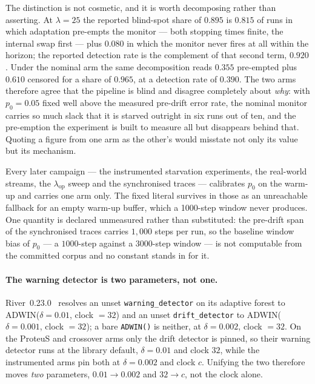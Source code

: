 The distinction is not cosmetic, and it is worth decomposing rather than asserting. At
$\lambda = 25$ the reported blind-spot share of $0.895$ is $0.815$ of runs in which adaptation
pre-empts the monitor --- both stopping times finite, the internal swap first --- plus $0.080$ in
which the monitor never fires at all within the horizon; the reported detection rate is the
complement of that second term, $0.920$. Under the nominal arm the same decomposition reads $0.355$
pre-empted plus $0.610$ censored for a share of $0.965$, at a detection rate of $0.390$. The two
arms therefore agree that the pipeline is blind and disagree completely about \emph{why}: with
$p_0 = 0.05$ fixed well above the measured pre-drift error rate, the nominal monitor carries so much
slack that it is starved outright in six runs out of ten, and the pre-emption the experiment is
built to measure all but disappears behind that. Quoting a figure from one arm as the other's would
misstate not only its value but its mechanism.

Every later campaign --- the instrumented starvation experiments, the real-world streams, the
$\lambda_{\mathrm{op}}$ sweep and the synchronised traces --- calibrates $p_0$ on the warm-up and
carries one arm only. The fixed literal survives in those as an unreachable fallback for an empty
warm-up buffer, which a 1000-step window never produces. One quantity is declared unmeasured
rather than substituted: the pre-drift span of the synchronised traces carries $1{,}000$ steps
per run, so the baseline window bias of $p_0$ --- a $1000$-step against a $3000$-step window ---
is not computable from the committed corpus and no constant stands in for it.

\paragraph{The warning detector is two parameters, not one.}
River~0.23.0~\cite{montiel_river_2021} resolves an unset \texttt{warning\_detector} on its adaptive forest to
ADWIN($\delta = 0.01$, clock $= 32$) and an unset \texttt{drift\_detector} to
ADWIN($\delta = 0.001$, clock $= 32$); a bare \texttt{ADWIN()} is neither, at
$\delta = 0.002$, clock $= 32$. On the ProteuS and crossover arms only the drift detector is pinned, so their warning detector runs at the library default, $\delta = 0.01$ and clock $32$, while the instrumented arms pin both at $\delta = 0.002$ and clock $c$. Unifying the two therefore moves
\emph{two} parameters, $0.01 \to 0.002$ and $32 \to c$, not the clock alone.

